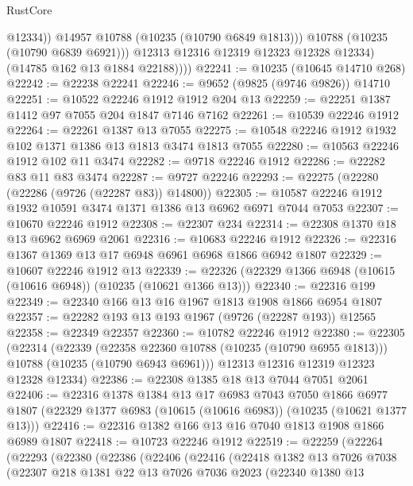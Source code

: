 \begin{lexlean}{RustCore}
\begin{coremodule}
                    @12334))
                @14957
                @10788
                (@10235 (@10790 @6849 @1813)))
              @10788
              (@10235 (@10790 @6839 @6921)))
            @12313
            @12316
            @12319
            @12323
            @12328
            @12334)
          (@14785 @162 @13 @1884 @22188))))
@22241 := @10235 (@10645 @14710 @268)
@22242 := @22238 @22241
@22246 := @9652 (@9825 (@9746 @9826)) @14710
@22251 := @10522 @22246 @1912 @1912 @204 @13
@22259 := @22251 @1387 @1412 @97 @7055 @204 @1847 @7146 @7162
@22261 := @10539 @22246 @1912
@22264 := @22261 @1387 @13 @7055
@22275 := @10548 @22246 @1912 @1932 @102 @1371 @1386 @13 @1813 @3474 @1813 @7055
@22280 := @10563 @22246 @1912 @102 @11 @3474
@22282 := @9718 @22246 @1912
@22286 := @22282 @83 @11 @83 @3474
@22287 := @9727 @22246
@22293 := @22275 (@22280 (@22286 (@9726 (@22287 @83)) @14800))
@22305 := @10587 @22246 @1912 @1932 @10591 @3474 @1371 @1386 @13 @6962 @6971 @7044 @7053
@22307 := @10670 @22246 @1912
@22308 := @22307 @234
@22314 := @22308 @1370 @18 @13 @6962 @6969 @2061
@22316 := @10683 @22246 @1912
@22326 := @22316 @1367 @1369 @13 @17 @6948 @6961 @6968 @1866 @6942 @1807
@22329 := @10607 @22246 @1912 @13
@22339 := @22326 (@22329 @1366 @6948 (@10615 (@10616 @6948)) (@10235 (@10621 @1366 @13)))
@22340 := @22316 @199
@22349 := @22340 @166 @13 @16 @1967 @1813 @1908 @1866 @6954 @1807
@22357 := @22282 @193 @13 @193 @1967 (@9726 (@22287 @193)) @12565
@22358 := @22349 @22357
@22360 := @10782 @22246 @1912
@22380 := @22305
    (@22314
      (@22339
        (@22358 @22360 @10788 (@10235 (@10790 @6955 @1813)))
        @10788
        (@10235 (@10790 @6943 @6961)))
      @12313
      @12316
      @12319
      @12323
      @12328
      @12334)
@22386 := @22308 @1385 @18 @13 @7044 @7051 @2061
@22406 := @22316
    @1378
    @1384
    @13
    @17
    @6983
    @7043
    @7050
    @1866
    @6977
    @1807
    (@22329 @1377 @6983 (@10615 (@10616 @6983)) (@10235 (@10621 @1377 @13)))
@22416 := @22316 @1382 @166 @13 @16 @7040 @1813 @1908 @1866 @6989 @1807
@22418 := @10723 @22246 @1912
@22519 := @22259
    (@22264
      (@22293
        (@22380
          (@22386
            (@22406
              (@22416
                (@22418
                  @1382
                  @13
                  @7026
                  @7038
                  (@22307
                    @218
                    @1381
                    @22
                    @13
                    @7026
                    @7036
                    @2023
                    (@22340
                      @1380
                      @13

\end{coremodule}
\end{lexlean}
